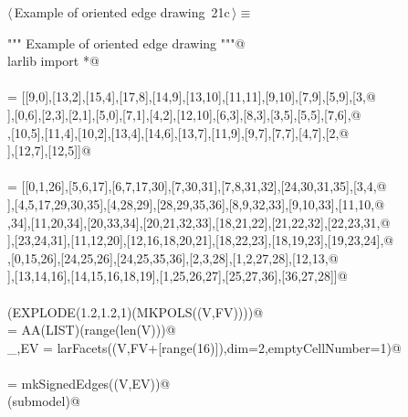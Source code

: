 \documentclass[11pt,oneside]{article}    %
\begin{document}
\begin{flushleft} \small \label{scrap36}
\protect{}$\langle\,$Example of oriented edge drawing\nobreak\ {\footnotesize 21c}$\,\rangle\equiv$
\vspace{-1ex}
\begin{list}{}{} \item
\mbox{}\verb@""" Example of oriented edge drawing """@\\
\mbox{}\verb@from larlib import *@\\
\mbox{}\verb@@\\
\mbox{}\verb@V = [[9,0],[13,2],[15,4],[17,8],[14,9],[13,10],[11,11],[9,10],[7,9],[5,9],[3,@\\
\mbox{}],[0,6],[2,3],[2,1],[5,0],[7,1],[4,2],[12,10],[6,3],[8,3],[3,5],[5,5],[7,6],@\\
\mbox{}\verb@[8,5],[10,5],[11,4],[10,2],[13,4],[14,6],[13,7],[11,9],[9,7],[7,7],[4,7],[2,@\\
\mbox{}],[12,7],[12,5]]@\\
\mbox{}\verb@@\\
\mbox{}\verb@FV = [[0,1,26],[5,6,17],[6,7,17,30],[7,30,31],[7,8,31,32],[24,30,31,35],[3,4,@\\
\mbox{}],[4,5,17,29,30,35],[4,28,29],[28,29,35,36],[8,9,32,33],[9,10,33],[11,10,@\\
\mbox{},34],[11,20,34],[20,33,34],[20,21,32,33],[18,21,22],[21,22,32],[22,23,31,@\\
\mbox{}],[23,24,31],[11,12,20],[12,16,18,20,21],[18,22,23],[18,19,23],[19,23,24],@\\
\mbox{}\verb@[15,19,24,26],[0,15,26],[24,25,26],[24,25,35,36],[2,3,28],[1,2,27,28],[12,13,@\\
\mbox{}],[13,14,16],[14,15,16,18,19],[1,25,26,27],[25,27,36],[36,27,28]]@\\
\mbox{}\verb@@\\
\mbox{}\verb@VIEW(EXPLODE(1.2,1.2,1)(MKPOLS((V,FV))))@\\
\mbox{}\verb@VV = AA(LIST)(range(len(V)))@\\
\mbox{}\verb@_,EV = larFacets((V,FV+[range(16)]),dim=2,emptyCellNumber=1)@\\
\mbox{}\verb@@\\
\mbox{}\verb@submodel = mkSignedEdges((V,EV))@\\
\mbox{}\verb@VIEW(submodel)@\\

\end{list}
\end{flushleft}
\end{document}
